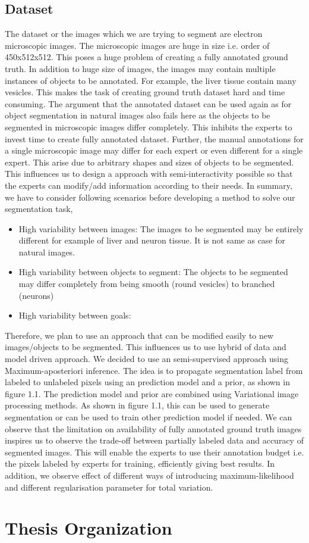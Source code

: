 \subsection{Dataset}
The dataset or the images which we are trying to segment are electron microscopic images. The microscopic images are huge in size i.e. order of 450x512x512. This poses a huge problem of creating a fully annotated ground truth. In addition to huge size of images, the images may contain multiple instances of objects to be annotated. For example, the liver tissue contain many vesicles. This makes the task of creating ground truth dataset hard and time consuming. The argument that the annotated dataset can be used again as for object segmentation in natural images also fails here as the objects to be segmented in microscopic images differ completely. This inhibits the experts to invest time to create fully annotated dataset. Further, the manual annotations for a single microscopic image may differ for each expert or even different for a single expert. This arise due to arbitrary shapes and sizes of objects to be segmented. This influences us to design a approach with semi-interactivity possible so that the experts can modify/add information according to their needs. In summary, we have to consider following scenarios before developing a method to solve our segmentation task, 
\begin{itemize}
\item High variability between images: The images to be segmented may be entirely different for example of liver and neuron tissue. It is not same as case for natural images.
\item High variability between objects to segment: The objects to be segmented may differ completely from being smooth (round vesicles) to branched (neurons)
\item High variability between goals: 
\end{itemize}

Therefore, we plan to use an approach that can be modified easily to new images/objects to be segmented. This influences us to use hybrid of data and model driven approach. We decided to use an semi-supervised approach using Maximum-aposteriori inference. The idea is to propagate segmentation label from labeled to unlabeled pixels using an prediction model and a prior, as shown in figure 1.1. The prediction model and prior are combined using Variational image processing methods. As shown in figure 1.1, this can be used to generate segmentation or can be used to train other prediction model if needed.
We can observe that the limitation on availability of fully annotated ground truth images inspires us to observe the trade-off between partially labeled data and accuracy of segmented images. This will enable the experts to use their annotation budget i.e. the pixels labeled by experts for training, efficiently giving best results. In addition, we observe effect of different ways of introducing maximum-likelihood and different regularisation parameter for total variation.

\section{Thesis Organization}



